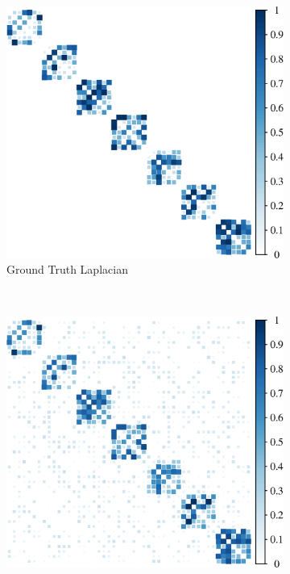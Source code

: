 \begin{figure}[!htb]
    \centering
    \begin{subfigure}[b]{0.3\textwidth}
      \includegraphics[width=\textwidth]{model-mismatch/latex/figures/true_mat.eps}
        \caption{Ground Truth Laplacian}
    \end{subfigure}
    ~ %
    \begin{subfigure}[b]{0.3\textwidth}
        \includegraphics[width=\textwidth]{model-mismatch/latex/figures/noisy_mat.eps}

\end{subfigure}
\end{figure}
